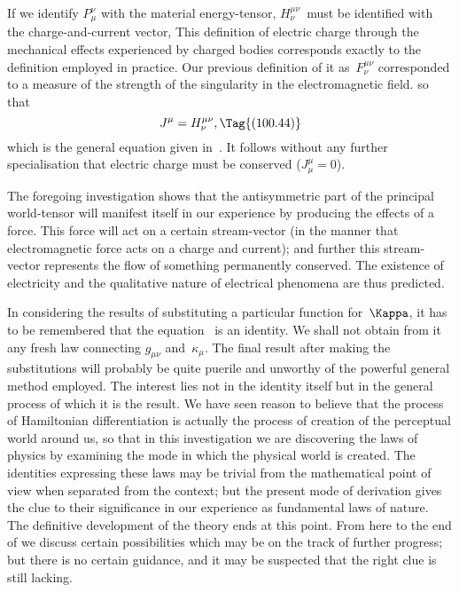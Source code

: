 \documentclass[12pt]{book}
\begin{document}
If we identify $P_{\mu}^{\nu}$ with the material energy-tensor, $H_{\nu}^{\mu\nu}$~must be identified
%
%
with the charge-and-current vector\footnotemark,\footnotetext
  {This definition of electric charge through the mechanical effects experienced by charged
  bodies corresponds exactly to the definition employed in practice. Our previous definition of it
  as~$F_{\nu}^{\mu\nu}$ corresponded to a measure of the strength of the singularity in the electromagnetic field.}
so that
\[
J^{\mu} = H_{\nu}^{\mu\nu},
\Tag{(100.44)}
\]
which is the general equation given in~. It follows without any further
specialisation that electric charge must be conserved ($J_{\mu}^{\mu} = 0$).

The foregoing investigation shows that the antisymmetric part of the
principal world-tensor will manifest itself in our experience by producing
the effects of a force. This force will act on a certain stream-vector (in
the manner that electromagnetic force acts on a charge and current); and
further this stream-vector represents the flow of something permanently conserved.
The existence of electricity and the qualitative nature of electrical
phenomena are thus predicted.

In considering the results of substituting a particular function for~$\Kappa$, it
has to be remembered that the equation~ is an identity. We shall
not obtain from it any fresh law connecting $g_{\mu\nu}$ and~$\kappa_{\mu}$. The final result after
making the substitutions will probably be quite puerile and unworthy of the
powerful general method employed. The interest lies not in the identity
itself but in the general process of which it is the result. We have seen
reason to believe that the process of Hamiltonian differentiation is actually
the process of creation of the perceptual world around us, so that in this
%
investigation we are discovering the laws of physics by examining the mode
in which the physical world is created. The identities expressing these
laws may be trivial from the mathematical point of view when separated
from the context; but the present mode of derivation gives the clue to their
significance in our experience as fundamental laws of nature\footnotemark.\footnotetext
  {The definitive development of the theory ends at this point. From here to the end of 
  we discuss certain possibilities which may be on the track of further progress; but there is no
  certain guidance, and it may be suspected that the right clue is still lacking.}
\end{document}
